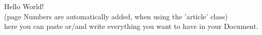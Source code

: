 \documentclass{article}				%
\begin{document}
	Hello World! \\
	(page Numbers are automatically added, when using the 'article' class) \\
	here you can paste or/and write everything you want to have in your Document.
\end{document}
